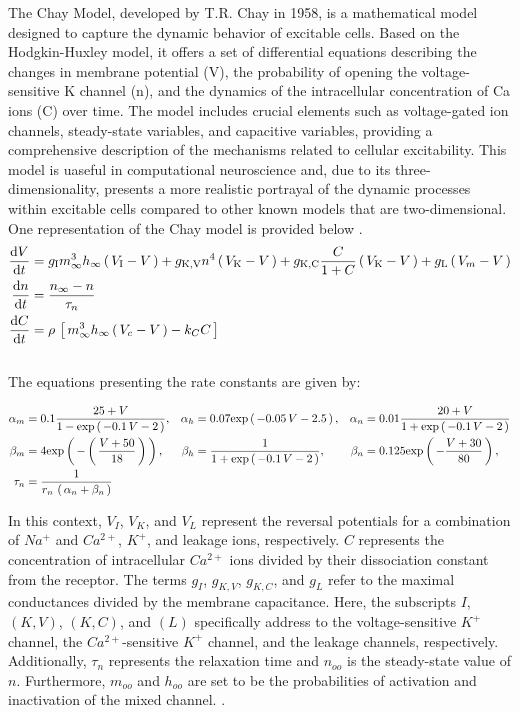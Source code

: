 \documentclass[class={.NoTouch/myProject}, crop=false]{standalone}
\begin{document}
The Chay Model, developed by T.R. Chay in 1958, is a mathematical model designed to capture the dynamic behavior of excitable cells. Based on the Hodgkin-Huxley model, it offers a set of differential equations describing the changes in membrane potential (V), the probability of opening the voltage-sensitive \gls{K} channel (n), and the dynamics of the intracellular concentration of \gls{Ca} ions (C) over time. The model includes crucial elements such as voltage-gated ion channels, steady-state variables, and capacitive variables, providing a comprehensive description of the mechanisms related to cellular excitability. This model is uaseful in computational neuroscience and, due to its three-dimensionality, presents a more realistic portrayal of the dynamic processes within excitable cells compared to other known models that are two-dimensional. One representation of the Chay model is provided below \cite{Chay1985}. \\
\begin{align}
    \ode{V} &= g_\mathrm{I}  m^3_\infty h_\infty \br{V_\mathrm{I} - V} + g_\mathrm{K, V} n^4 \br{V_\mathrm{K} - V} + g_\mathrm{K, C}  \frac{C}{1+C}\br{V_\mathrm{K} - V} + g_\mathrm{L} \br{V_m - V} \\
    \ode{n} &= \frac{n_\infty - n}{\tau_n} \\
    \ode{C} &= \rho \, \sbr{m^3_\infty h_\infty \br{V_c - V} - k_C C}
\end{align}\\

The equations presenting the rate constants are given by:

\begin{align*}
    \alpha_m &= 0.1 \frac{25 + V}{1 - \exp{-0.1 \, V - 2}}, &
    \alpha_h &=  0.07 \exp{-0.05\,V -2.5}, &
    \alpha_n &= 0.01 \frac{20 + V}{1 + \exp{-0.1 \, V - 2}} \\
    \beta_m  &= 4 \exp{-\br{\frac{ V + 50 }{ 18 } } }, &
    \beta_h  &= \frac{ 1 }{ 1 + \exp{-0.1 \, V - 2}}, &
    \beta_n  &= 0.125 \exp{- \frac{V + 30}{80}}, \\
    \tau_n &= \frac{1}{ r_n \, \br{\alpha_n + \beta_n} }
\end{align*} 

In this context, $V_I$, $V_K$, and $V_L$ represent the reversal potentials for a combination of $Na^+$ and $Ca^{2+}$, $K^+$, and leakage ions, respectively. $C$ represents the concentration of intracellular $Ca^{2+}$ ions divided by their dissociation constant from the receptor. The terms $g_I$, $g_{K,V}$, $g_{K,C}$, and $g_L$ refer to the maximal conductances divided by the membrane capacitance. Here, the subscripts $I$, $(K,V)$, $(K,C)$, and $(L)$ specifically address to the voltage-sensitive $K^+$ channel, the $Ca^{2+}$-sensitive $K^+$ channel, and the leakage channels, respectively. Additionally, $\tau_n$ represents the relaxation time and $n_{oo}$ is the steady-state value of $n$. Furthermore, $m_{oo}$ and $h_{oo}$ are set to  be the probabilities of activation and inactivation of the mixed channel. \cite{Chay1985}.
\end{document}
